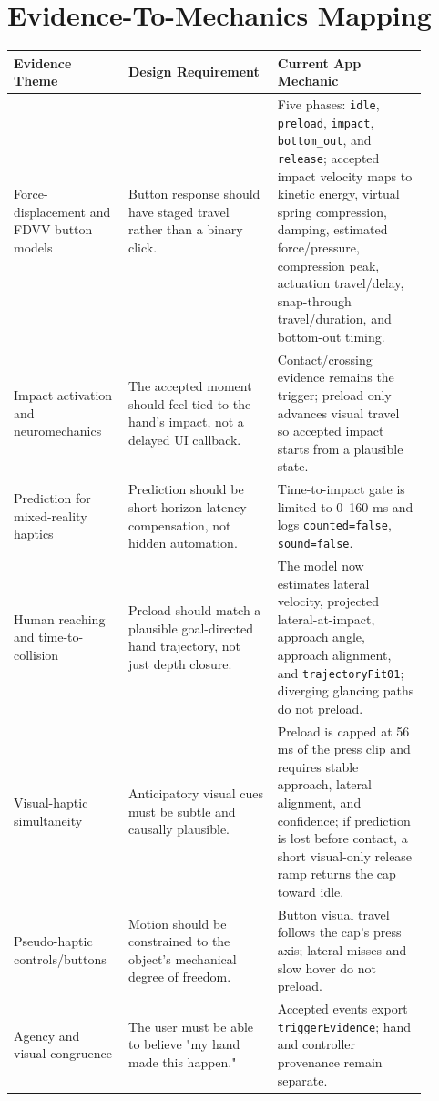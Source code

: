 \documentclass[11pt]{article}
\begin{document}
\section{Evidence-To-Mechanics Mapping}
\begin{longtable}{p{0.24\linewidth}p{0.33\linewidth}p{0.33\linewidth}}
\toprule
Evidence Theme & Design Requirement & Current App Mechanic \\
\midrule
Force-displacement and FDVV button models & Button response should have staged travel rather than a binary click. & Five phases: \texttt{idle}, \texttt{preload}, \texttt{impact}, \texttt{bottom\_out}, and \texttt{release}; accepted impact velocity maps to kinetic energy, virtual spring compression, damping, estimated force/pressure, compression peak, actuation travel/delay, snap-through travel/duration, and bottom-out timing. \\
Impact activation and neuromechanics & The accepted moment should feel tied to the hand's impact, not a delayed UI callback. & Contact/crossing evidence remains the trigger; preload only advances visual travel so accepted impact starts from a plausible state. \\
Prediction for mixed-reality haptics & Prediction should be short-horizon latency compensation, not hidden automation. & Time-to-impact gate is limited to 0--160 ms and logs \texttt{counted=false}, \texttt{sound=false}. \\
Human reaching and time-to-collision & Preload should match a plausible goal-directed hand trajectory, not just depth closure. & The model now estimates lateral velocity, projected lateral-at-impact, approach angle, approach alignment, and \texttt{trajectoryFit01}; diverging glancing paths do not preload. \\
Visual-haptic simultaneity & Anticipatory visual cues must be subtle and causally plausible. & Preload is capped at 56 ms of the press clip and requires stable approach, lateral alignment, and confidence; if prediction is lost before contact, a short visual-only release ramp returns the cap toward idle. \\
Pseudo-haptic controls/buttons & Motion should be constrained to the object's mechanical degree of freedom. & Button visual travel follows the cap's press axis; lateral misses and slow hover do not preload. \\
Agency and visual congruence & The user must be able to believe "my hand made this happen." & Accepted events export \texttt{triggerEvidence}; hand and controller provenance remain separate. \\

\end{longtable}
\end{document}
